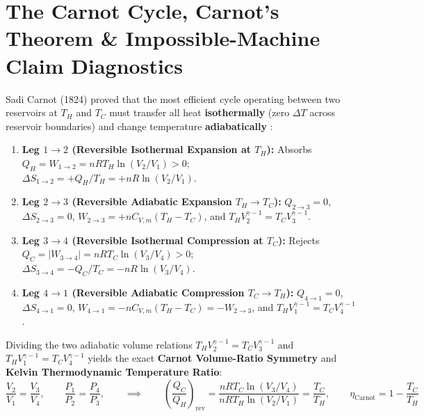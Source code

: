 \section{The Carnot Cycle, Carnot's Theorem \& Impossible-Machine Claim Diagnostics}\label{sec:09.2}

Sadi Carnot (1824) proved that the most efficient cycle operating between two reservoirs at $T_H$ and $T_C$ must transfer all heat \textbf{isothermally} (zero $\Delta T$ across reservoir boundaries) and change temperature \textbf{adiabatically} :
\begin{enumerate}
  \item \textbf{Leg $1\to 2$ (Reversible Isothermal Expansion at $T_H$):} Absorbs $Q_H = W_{1\to 2} = nRT_H\ln(V_2/V_1) > 0$; $\Delta S_{1\to 2} = +Q_H/T_H = +nR\ln(V_2/V_1)$.
  \item \textbf{Leg $2\to 3$ (Reversible Adiabatic Expansion $T_H \to T_C$):} $Q_{2\to 3} = 0$, $\Delta S_{2\to 3} = 0$, $W_{2\to 3} = +nC_{V,m}(T_H - T_C)$, and $T_H V_2^{\gamma-1} = T_C V_3^{\gamma-1}$.
  \item \textbf{Leg $3\to 4$ (Reversible Isothermal Compression at $T_C$):} Rejects $Q_C = |W_{3\to 4}| = nRT_C\ln(V_3/V_4) > 0$; $\Delta S_{3\to 4} = -Q_C/T_C = -nR\ln(V_3/V_4)$.
  \item \textbf{Leg $4\to 1$ (Reversible Adiabatic Compression $T_C \to T_H$):} $Q_{4\to 1} = 0$, $\Delta S_{4\to 1} = 0$, $W_{4\to 1} = -nC_{V,m}(T_H - T_C) = -W_{2\to 3}$, and $T_H V_1^{\gamma-1} = T_C V_4^{\gamma-1}$.
\end{enumerate}
Dividing the two adiabatic volume relations $T_H V_2^{\gamma-1} = T_C V_3^{\gamma-1}$ and $T_H V_1^{\gamma-1} = T_C V_4^{\gamma-1}$ yields the exact \textbf{Carnot Volume-Ratio Symmetry} and \textbf{Kelvin Thermodynamic Temperature Ratio}:
\begin{equation}\label{eq:09:carnot-symmetry}
  \boxed{\frac{V_2}{V_1} = \frac{V_3}{V_4}, \qquad \frac{P_1}{P_2} = \frac{P_4}{P_3}}, \qquad \implies \qquad \boxed{\left(\frac{Q_C}{Q_H}\right)_{\mathrm{rev}} = \frac{nRT_C\ln(V_3/V_4)}{nRT_H\ln(V_2/V_1)} = \frac{T_C}{T_H}}, \qquad \boxed{\eta_{\mathrm{Carnot}} = 1 - \frac{T_C}{T_H}}
\end{equation}

